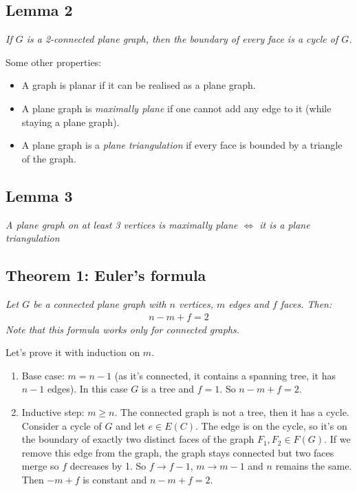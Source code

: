 		
		\subsection{Lemma 2}
		\textit{If $G$ is a 2-connected plane graph, then the boundary of every face is a cycle of $G$.\\}
		
		Some other properties:
		\begin{itemize}
			\item A graph is planar if it can be realised as a plane graph.
			\item A plane graph is \textit{maximally plane} if one cannot add any edge to it (while staying a plane graph).
			\item A plane graph is a \textit{plane triangulation} if every face is bounded by a triangle of the graph.
		\end{itemize}
		
		
		\subsection{Lemma 3}
		\textit{A plane graph on at least 3 vertices is maximally plane $\iff$ it is a plane triangulation}
		
		
		\subsection{Theorem 1: Euler's formula}
		\textit{Let $G$ be a connected plane graph with $n$ vertices, $m$ edges and $f$ faces. Then:}
		\begin{eqnarray}
			n - m + f = 2
		\end{eqnarray}
		\textit{Note that this formula works only for connected graphs.\\}
		
		Let's prove it with induction on $m$.
		\begin{enumerate}
			\item Base case: $m = n -1$ (as it's connected, it contains a spanning tree, it has $n - 1$ edges). In this case $G$ is a tree and $f = 1$. So $n - m + f = 2$.
			\item Inductive step: $m \geq n$. The connected graph is not a tree, then it has a cycle. Consider a cycle of $G$ and let $e \in E(C)$. The edge is on the cycle, so it's on the boundary of exactly two distinct faces of the graph $F_1, F_2 \in F(G)$. If we remove this edge from the graph, the graph stays connected but two faces merge so $f$ decreases by 1. So $f \rightarrow f -1$, $m \rightarrow m - 1$ and $n$ remains the same. Then $-m + f$ is constant and $n -m + f = 2$.
		\end{enumerate}
		
